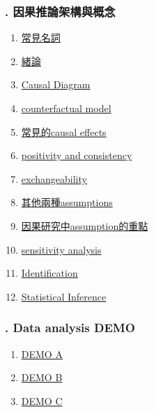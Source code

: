 \documentclass[11pt]{article}
\begin{document}
\vspace{-1cm}

\subsubsection*{. 因果推論架構與概念}

\vspace{-0.5cm}

\begin{enumerate}
	\item \href{https://mp.weixin.qq.com/s/tBHwHv3gQdgX2lKMJfHpcA}{常見名詞}	%
	\item \href{https://mp.weixin.qq.com/s/6F7J_KaNsKEnnQF3M1peJQ}{緒論}	%
	\item \href{https://mp.weixin.qq.com/s/gsIw1zhrvkF2dZnxNKzoEA}{Causal Diagram}	%
	\item \href{https://mp.weixin.qq.com/s/FC3qJ9acrJZbV208v17UTA}{counterfactual model}	%
	\item \href{https://mp.weixin.qq.com/s/q-xD8pj2bM2RfD67PlEPmA}{常見的causal effects}	%
	\item \href{https://mp.weixin.qq.com/s/yiZLG7CQsUCsek88vNz39A}{positivity and consistency}	%
	\item \href{https://mp.weixin.qq.com/s/BgCtclwJsd_vJlFuppHiIQ}{exchangeability}	%
	\item \href{https://mp.weixin.qq.com/s/aeflhUV9ooP80hSoPtd4Ew}{其他兩種assumptions}	%
	\item \href{https://mp.weixin.qq.com/s/tjGhDj2vW7btp9_mpH7fsQ}{因果研究中assumption的重點}	%
	\item \href{https://mp.weixin.qq.com/s/ygs4MYKA3s-eZnrO7q6GSA}{sensitivity analysis}	%
	\item \href{https://mp.weixin.qq.com/s/Lwy0ZgNU9E-m7xtYjEwZYA}{Identification}	%
	\item \href{https://mp.weixin.qq.com/s/6XFNSn2uEQhJVoqj2zfbvQ}{Statistical Inference}	%
\end{enumerate}

\vspace{-1cm}

\subsubsection*{. Data analysis DEMO}

\vspace{-0.5cm}

\begin{enumerate}
	\item \href{https://mp.weixin.qq.com/s/6GagqDA5KoD1ITFghalsHA}{DEMO A}	%
	\item \href{https://mp.weixin.qq.com/s/gW1Ho58AGP0manJkTh7uRw}{DEMO B}	%
	\item \href{https://mp.weixin.qq.com/s/nc8LYP3OUiwaeXKXUIL3GA}{DEMO C}	%
\end{enumerate}
\end{document}

